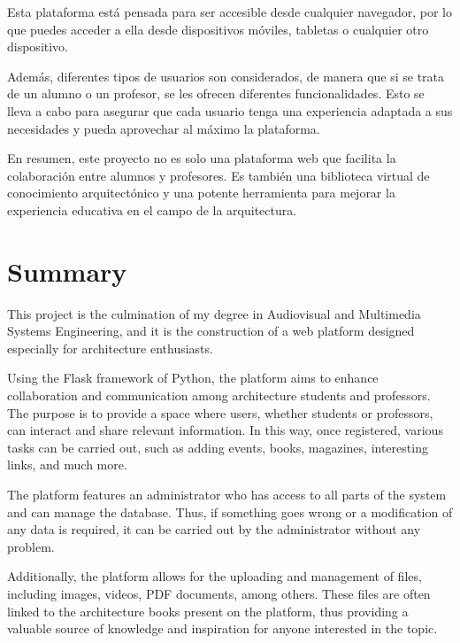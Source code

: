 \documentclass[a4paper, 12pt]{book}
\begin{document}
Esta plataforma está pensada para ser accesible desde cualquier navegador, por lo que puedes acceder a ella desde dispositivos móviles, 
tabletas o cualquier otro dispositivo. 

Además, diferentes tipos de usuarios son considerados, de manera que si se trata de un alumno o un profesor, se les ofrecen diferentes 
funcionalidades. Esto se lleva a cabo para asegurar que cada usuario tenga una experiencia adaptada a sus necesidades y pueda aprovechar 
al máximo la plataforma.

En resumen, este proyecto no es solo una plataforma web que facilita la colaboración entre alumnos y profesores. Es también 
una biblioteca virtual de conocimiento arquitectónico y una potente herramienta para mejorar la experiencia educativa en el 
campo de la arquitectura.


\chapter*{Summary}

This project is the culmination of my degree in Audiovisual and Multimedia Systems Engineering, and it is the 
construction of a web platform designed especially for architecture enthusiasts.

Using the Flask framework of Python, the platform aims to enhance collaboration and communication among architecture 
students and professors. The purpose is to provide a space where users, whether students or professors, can interact 
and share relevant information. In this way, once registered, various tasks can be carried out, such as adding events, 
books, magazines, interesting links, and much more.

The platform features an administrator who has access to all parts of the system and can manage the database. Thus, 
if something goes wrong or a modification of any data is required, it can be carried out by the administrator without any problem.

Additionally, the platform allows for the uploading and management of files, including images, videos, PDF documents, 
among others. These files are often linked to the architecture books present on the platform, thus providing a valuable 
source of knowledge and inspiration for anyone interested in the topic.
\end{document}
